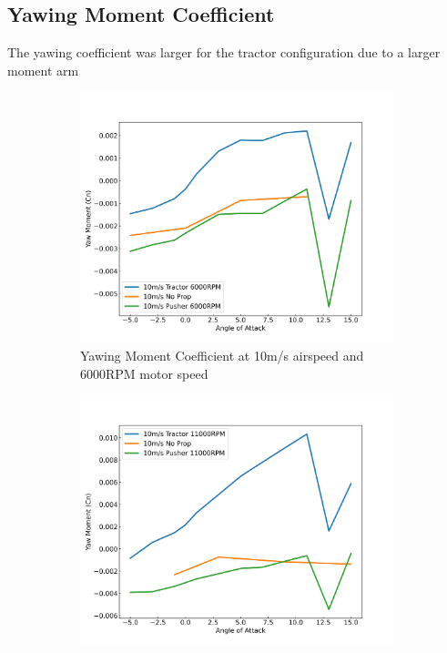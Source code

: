 \subsection{Yawing Moment Coefficient}
The yawing coefficient was larger for the tractor configuration due to a larger moment arm 

\begin{figure}[H]
    \centering
    \begin{subfigure}[b]{0.467\textwidth}
        \centering
        \includegraphics[width=\textwidth]{05_Results/Figs/Cn/10ms_6000RPM_Cn.png}
        \caption{Yawing Moment Coefficient at 10m/s airspeed and 6000RPM motor speed}
        \label{fig:Cn_10ms_6000}
    \end{subfigure}
    \begin{subfigure}[b]{0.467\textwidth}
        \centering
        \includegraphics[width=\textwidth]{05_Results/Figs/Cn/10ms_11000RPM_Cn.png}

\end{subfigure}
\end{figure}
